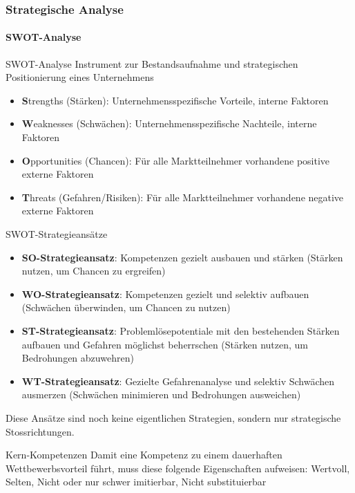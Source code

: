 \subsubsection{Strategische Analyse}

\paragraph{SWOT-Analyse}

\begin{definition}{SWOT-Analyse}
Instrument zur Bestandsaufnahme und strategischen Positionierung eines Unternehmens
\begin{itemize}
    \item \textbf{S}trengths (Stärken): Unternehmensspezifische Vorteile, interne Faktoren
    \item \textbf{W}eaknesses (Schwächen): Unternehmensspezifische Nachteile, interne Faktoren
    \item \textbf{O}pportunities (Chancen): Für alle Marktteilnehmer vorhandene positive externe Faktoren
    \item \textbf{T}hreats (Gefahren/Risiken): Für alle Marktteilnehmer vorhandene negative externe Faktoren
\end{itemize}
\end{definition}

\begin{concept}{SWOT-Strategieansätze}
\begin{itemize}
    \item \textbf{SO-Strategieansatz}: Kompetenzen gezielt ausbauen und stärken (Stärken nutzen, um Chancen zu ergreifen)
    \item \textbf{WO-Strategieansatz}: Kompetenzen gezielt und selektiv aufbauen (Schwächen überwinden, um Chancen zu nutzen)
    \item \textbf{ST-Strategieansatz}: Problemlösepotentiale mit den bestehenden Stärken aufbauen und Gefahren möglichst beherrschen (Stärken nutzen, um Bedrohungen abzuwehren)
    \item \textbf{WT-Strategieansatz}: Gezielte Gefahrenanalyse und selektiv Schwächen ausmerzen (Schwächen minimieren und Bedrohungen ausweichen)
\end{itemize}
 Diese Ansätze sind noch keine eigentlichen Strategien, sondern nur strategische Stossrichtungen.
\end{concept}

\begin{theorem}{Kern-Kompetenzen}
Damit eine Kompetenz zu einem dauerhaften Wettbewerbsvorteil führt, muss diese folgende Eigenschaften aufweisen:
Wertvoll, Selten, Nicht oder nur schwer imitierbar, Nicht substituierbar
\end{theorem}

